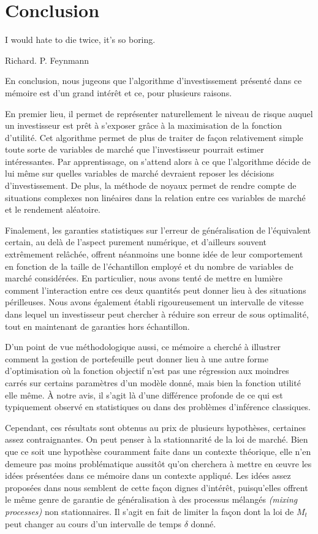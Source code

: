 \section{Conclusion}
\label{sec:conclusion}

\epigraph{I would hate to die twice, it's so boring.}{Richard. P. Feynmann}


En conclusion, nous jugeons que l'algorithme d'investissement présenté dans ce mémoire est
d'un grand intérêt et ce, pour plusieurs raisons.

En premier lieu, il permet de représenter naturellement le niveau de risque auquel un
investisseur est prêt à s'exposer grâce à la maximisation de la fonction d'utilité. Cet
algorithme permet de plus de traiter de façon relativement simple toute sorte de
variables de marché que l'investisseur pourrait estimer intéressantes. Par apprentissage,
on s'attend alors à ce que l'algorithme décide de lui même sur quelles variables de marché
devraient reposer les décisions d'investissement. De plus, la méthode de noyaux permet de
rendre compte de situations complexes non linéaires dans la relation entre ces variables
de marché et le rendement aléatoire.

Finalement, les garanties statistiques sur l'erreur de généralisation de l'équivalent
certain, au delà de l'aspect purement numérique, et d'ailleurs souvent extrêmement
relâchée, offrent néanmoins une bonne idée de leur comportement en fonction de la taille
de l'échantillon employé et du nombre de variables de marché considérées. En particulier,
nous avons tenté de mettre en lumière comment l'interaction entre ces deux quantités peut
donner lieu à des situations périlleuses. Nous avons également établi rigoureusement un
intervalle de vitesse dans lequel un investisseur peut chercher à réduire son erreur de
sous optimalité, tout en maintenant de garanties hors échantillon.

D'un point de vue méthodologique aussi, ce mémoire a cherché à illustrer comment la
gestion de portefeuille peut donner lieu à une autre forme d'optimisation où la fonction
objectif n'est pas une régression aux moindres carrés sur certains paramètres d'un modèle
donné, mais bien la fonction utilité elle même. À notre avis, il s'agit là d'une
différence profonde de ce qui est typiquement observé en statistiques ou dans des
problèmes d'inférence classiques.

Cependant, ces résultats sont obtenus au prix de plusieurs hypothèses, certaines assez
contraignantes. On peut penser à la stationnarité de la loi de marché. Bien que ce soit
une hypothèse couramment faite dans un contexte théorique, elle n'en demeure pas moins
problématique aussitôt qu'on cherchera à mettre en œuvre les idées présentées dans ce
mémoire dans un contexte appliqué. Les idées assez proposées dans
\cite{kuznetsov2017generalization} nous semblent de cette façon dignes d'intérêt,
puisqu'elles offrent le même genre de garantie de généralisation à des processus mélangés
\textsl{(mixing processes)} non stationnaires. Il s'agit en fait de limiter la façon dont
la loi de $M_t$ peut changer au cours d'un intervalle de temps $\delta$ donné.

